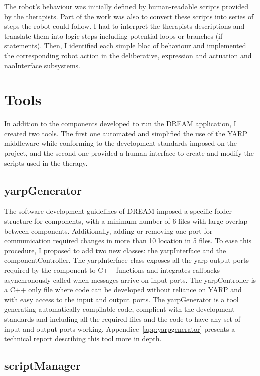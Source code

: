 The robot's behaviour was initially defined by human-readable scripts provided by the therapists. Part of the work was also to convert these scripts into series of steps the robot could follow. I had to interpret the therapists descriptions and translate them into logic steps including potential loops or branches (if statements). Then, I identified each simple bloc of behaviour and implemented the corresponding robot action in the deliberative, expression and actuation and naoInterface subsystems.

\section{Tools}

In addition to the components developed to run the DREAM application, I created two tools. The first one automated and simplified the use of the YARP middleware while conforming to the development standards imposed on the project, and the second one provided a human interface to create and modify the scripts used in the therapy.

\subsection{yarpGenerator}

The software development guidelines of DREAM imposed a specific folder structure for components, with a minimum number of 6 files with large overlap between components. Additionally, adding or removing one port for communication required changes in more than 10 location in 5 files. To ease this procedure, I proposed to add two new classes: the yarpInterface and the componentController. The yarpInterface class exposes all the yarp output ports required by the component to C++ functions and integrates callbacks asynchronously called when messages arrive on input ports. The yarpController is a C++ only file where code can be developed without reliance on YARP and with easy access to the input and output ports. The yarpGenerator is a tool generating automatically compilable code, complient with the development standards and including all the required files and the code to have any set of input and output ports working. Appendice~\ref{app:yarpgenerator} presents a technical report describing this tool more in depth.

\subsection{scriptManager}

